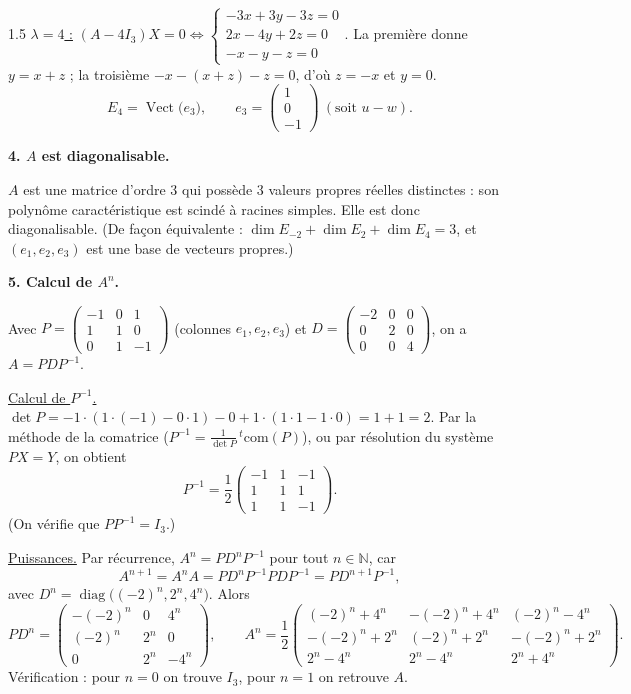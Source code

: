 \documentclass[12pt]{article}
\begin{document}
\begin{spacing}{1.5}
\underline{$\lambda=4$ :} $(A-4I_3)X=0 \iff \begin{cases}-3x+3y-3z=0\\2x-4y+2z=0\\-x-y-z=0\end{cases}$. La première donne $y=x+z$ ; la troisième $-x-(x+z)-z=0$, d'où $z=-x$ et $y=0$.
\[
E_{4}=\operatorname{Vect}\big(e_3\big),\qquad e_3=\begin{pmatrix}1\\0\\-1\end{pmatrix}\ (\text{soit } u-w).
\]

\textbf{4. $A$ est diagonalisable.}

$A$ est une matrice d'ordre $3$ qui possède $3$ valeurs propres réelles distinctes : son polynôme caractéristique est scindé à racines simples. Elle est donc diagonalisable. (De façon équivalente : $\dim E_{-2}+\dim E_2+\dim E_4=3$, et $(e_1,e_2,e_3)$ est une base de vecteurs propres.)

\textbf{5. Calcul de $A^n$.}

Avec $P=\begin{pmatrix}
-1 & 0 & 1 \\
1 & 1 & 0 \\
0 & 1 & -1
\end{pmatrix}$ (colonnes $e_1,e_2,e_3$) et $D=\begin{pmatrix}
-2 & 0 & 0 \\
0 & 2 & 0 \\
0 & 0 & 4
\end{pmatrix}$, on a $A=PDP^{-1}$.

\underline{Calcul de $P^{-1}$.} $\det P=-1\cdot(1\cdot(-1)-0\cdot1)-0+1\cdot(1\cdot1-1\cdot0)=1+1=2$. Par la méthode de la comatrice ($P^{-1}=\frac{1}{\det P}\,{}^t\mathrm{com}(P)$), ou par résolution du système $PX=Y$, on obtient
\[
P^{-1}=\frac12\begin{pmatrix}
-1 & 1 & -1 \\
1 & 1 & 1 \\
1 & 1 & -1
\end{pmatrix}.
\]
(On vérifie que $PP^{-1}=I_3$.)

\underline{Puissances.} Par récurrence, $A^n=PD^nP^{-1}$ pour tout $n\in\mathbb{N}$, car
\[
A^{n+1}=A^nA=PD^nP^{-1}PDP^{-1}=PD^{n+1}P^{-1},
\]
avec $D^n=\operatorname{diag}\big((-2)^n,2^n,4^n\big)$. Alors
\[
PD^n=\begin{pmatrix}
-(-2)^n & 0 & 4^n \\
(-2)^n & 2^n & 0 \\
0 & 2^n & -4^n
\end{pmatrix},
\qquad
\boxed{A^n=\frac12\begin{pmatrix}
(-2)^n+4^n & -(-2)^n+4^n & (-2)^n-4^n \\
-(-2)^n+2^n & (-2)^n+2^n & -(-2)^n+2^n \\
2^n-4^n & 2^n-4^n & 2^n+4^n
\end{pmatrix}}.
\]
Vérification : pour $n=0$ on trouve $I_3$, pour $n=1$ on retrouve $A$.


\end{spacing}
\end{document}
